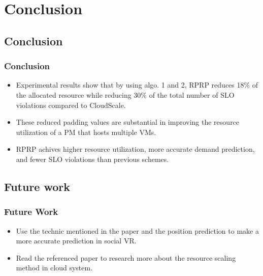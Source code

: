 \documentclass{beamer}
\begin{document}
\section{Conclusion}

\subsection{Conclusion}
	\begin{frame}
	\frametitle{Conclusion}
		\begin{itemize}
		\item Experimental results show that by using algo. 1 and 2, RPRP reduces 18\% of the allocated resource while reducing 30\% of the total number of SLO violations compared to CloudScale.
		\item These reduced padding values are substantial in improving the resource utilization of a PM that hosts multiple VMs.
		\item RPRP achives higher resource utilization, more accurate demand prediction, and fewer SLO violations than previous schemes.
		\end{itemize}
	\end{frame}

\subsection{Future work}
	\begin{frame}
	\frametitle{Future Work}
		\begin{itemize}
		\item Use the technic mentioned in the paper and the position prediction to make a more accurate prediction in social VR.
		\item Read the referenced paper to research more about the resource scaling method in cloud system.
		\end{itemize}
	\end{frame}
\end{document}
